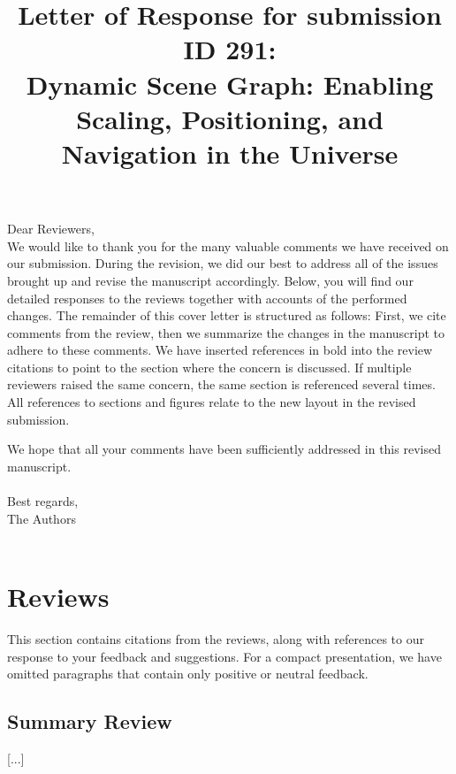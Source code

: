 \documentclass{article}
\begin{document}
\title{Letter of Response for submission ID 291: \\Dynamic Scene Graph: Enabling Scaling, Positioning, and Navigation in the Universe}
\maketitle

Dear Reviewers, \\

We would like to thank you for the many valuable comments we have received on
our submission.
During the revision, we did our best to address all of the issues brought up and revise the manuscript accordingly.
Below, you will find our detailed responses to the reviews together with accounts of the performed changes.
The remainder of this cover letter is structured as follows:
First, we cite comments from the review, then we summarize the changes in the manuscript to adhere to these comments.
We have inserted references in bold into the review citations to point to the section where the concern is discussed.
If multiple reviewers raised the same concern, the same section is referenced several times.
All references to sections and figures relate to the new layout in the revised submission.

We hope that all your comments have been sufficiently addressed in this revised manuscript. \\\\

Best regards, \\
The Authors \\\\

\newpage


\section{Reviews}
This section contains citations from the reviews, along with references to our response to your feedback and suggestions. For a compact presentation, we have omitted paragraphs that contain only positive or neutral feedback.


\subsection*{Summary Review}

[...]
\end{document}

